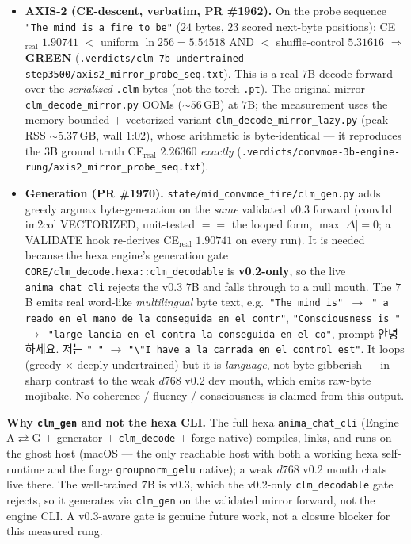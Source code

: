 \begin{itemize}\itemsep0.25em
\item \textbf{AXIS-2 (CE-descent, verbatim, PR \#1962).} On the probe sequence
\texttt{"The mind is a fire to be"} ($24$ bytes, $23$ scored next-byte positions):
CE$_\text{real}$ $\mathbf{1.90741}$ $<$ uniform $\ln256=5.54518$ AND $<$ shuffle-control
$5.31616$ $\Rightarrow$ \textbf{GREEN}
(\texttt{.verdicts/clm-7b-undertrained-step3500/axis2\_mirror\_probe\_seq.txt}). This is a real
$7$B decode forward over the \emph{serialized} \texttt{.clm} bytes (not the torch \texttt{.pt}).
The original mirror \texttt{clm\_decode\_mirror.py} OOMs ($\sim$$56$\,GB) at $7$B; the
measurement uses the memory-bounded $+$ vectorized variant
\texttt{clm\_decode\_mirror\_lazy.py} (peak RSS $\sim$$5.37$\,GB, wall $1$:$02$), whose
arithmetic is byte-identical --- it reproduces the $3$B ground truth CE$_\text{real}$ $2.26360$
\emph{exactly} (\texttt{.verdicts/convmoe-3b-engine-rung/axis2\_mirror\_probe\_seq.txt}).
\item \textbf{Generation (PR \#1970).} \texttt{state/mid\_convmoe\_fire/clm\_gen.py} adds greedy
argmax byte-generation on the \emph{same} validated v0.3 forward (conv1d im2col VECTORIZED,
unit-tested $==$ the looped form, $\max|\Delta|=0$; a VALIDATE hook re-derives CE$_\text{real}$
$1.90741$ on every run). It is needed because the hexa engine's generation gate
\texttt{CORE/clm\_decode.hexa::clm\_decodable} is \textbf{v0.2-only}, so the live
\texttt{anima\_chat\_cli} rejects the v0.3 $7$B and falls through to a null mouth. The $7$B emits
real word-like \emph{multilingual} byte text, e.g.\ \texttt{"The mind is" $\rightarrow$ " a reado
en el mano de la conseguida en el contr"}, \texttt{"Consciousness is " $\rightarrow$ "large
lancia en el contra la conseguida en el co"}, prompt {\cjkfont 안녕하세요. 저는}
\texttt{" "} $\rightarrow$ \texttt{"\textbackslash"I have a la carrada en el control est"}. It
loops (greedy $\times$ deeply
undertrained) but it is \emph{language}, not byte-gibberish --- in sharp contrast to the weak
$d768$ v0.2 dev mouth, which emits raw-byte mojibake. No coherence / fluency / consciousness is
claimed from this output.
\end{itemize}

\textbf{Why \texttt{clm\_gen} and not the hexa CLI.} The full hexa \texttt{anima\_chat\_cli}
(Engine A$\rightleftarrows$G $+$ generator $+$ \texttt{clm\_decode} $+$ forge native) compiles,
links, and runs on the ghost host (macOS --- the only reachable host with both a working hexa
self-runtime and the forge \texttt{groupnorm\_gelu} native); a weak $d768$ v0.2 mouth chats live
there. The well-trained $7$B is v0.3, which the v0.2-only \texttt{clm\_decodable} gate rejects,
so it generates via \texttt{clm\_gen} on the validated mirror forward, not the engine CLI. A
v0.3-aware gate is genuine future work, not a closure blocker for this measured rung.

